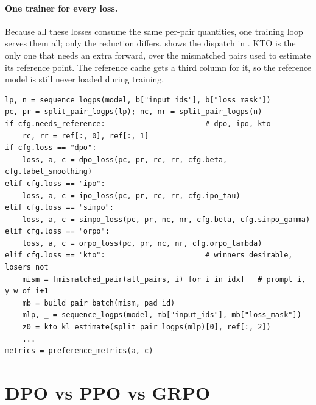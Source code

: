 \paragraph{One trainer for every loss.} Because all these losses consume the same per-pair
quantities, one training loop serves them all; only the reduction differs.
 shows the dispatch in . KTO is the only one that
needs an extra forward, over the mismatched pairs used to estimate its reference point. The
reference cache gets a third column for it, so the reference model is still never loaded during
training.

\begin{lstlisting}[caption={Dispatching on the loss type in one training step (\ident{preference_step_loss}, abridged).},label={lst:dpo:dispatch}]
lp, n = sequence_logps(model, b["input_ids"], b["loss_mask"])
pc, pr = split_pair_logps(lp); nc, nr = split_pair_logps(n)
if cfg.needs_reference:                       # dpo, ipo, kto
    rc, rr = ref[:, 0], ref[:, 1]
if cfg.loss == "dpo":
    loss, a, c = dpo_loss(pc, pr, rc, rr, cfg.beta, cfg.label_smoothing)
elif cfg.loss == "ipo":
    loss, a, c = ipo_loss(pc, pr, rc, rr, cfg.ipo_tau)
elif cfg.loss == "simpo":
    loss, a, c = simpo_loss(pc, pr, nc, nr, cfg.beta, cfg.simpo_gamma)
elif cfg.loss == "orpo":
    loss, a, c = orpo_loss(pc, pr, nc, nr, cfg.orpo_lambda)
elif cfg.loss == "kto":                       # winners desirable, losers not
    mism = [mismatched_pair(all_pairs, i) for i in idx]   # prompt i, y_w of i+1
    mb = build_pair_batch(mism, pad_id)
    mlp, _ = sequence_logps(model, mb["input_ids"], mb["loss_mask"])
    z0 = kto_kl_estimate(split_pair_logps(mlp)[0], ref[:, 2])
    ...
metrics = preference_metrics(a, c)
\end{lstlisting}

\section{DPO vs PPO vs GRPO}\label{sec:dpo:compare}

